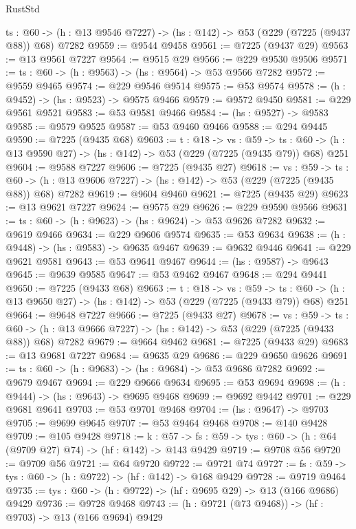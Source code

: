 \begin{lexlean}{RustStd}
\begin{coremodule}
  {ts : @60} -> (h : @13 @9546 @7227) -> (hs : @142) -> @53 (@229 (@7225 (@9437 @88)) @68) @7282
@9559 := @9544 @9458
@9561 := @7225 (@9437 @29)
@9563 := @13 @9561 @7227
@9564 := @9515 @29
@9566 := @229 @9530 @9506
@9571 := {ts : @60} -> (h : @9563) -> (hs : @9564) -> @53 @9566 @7282
@9572 := @9559 @9465
@9574 := @229 @9546 @9514
@9575 := @53 @9574
@9578 := (h : @9452) -> (hs : @9523) -> @9575 @9466
@9579 := @9572 @9450
@9581 := @229 @9561 @9521
@9583 := @53 @9581 @9466
@9584 := (hs : @9527) -> @9583
@9585 := @9579 @9525
@9587 := @53 @9460 @9466
@9588 := @294 @9445
@9590 := @7225 (@9435 @68)
@9603 := {t : @18} ->
  {vs : @59} ->
  {ts : @60} -> (h : @13 @9590 @27) -> (hs : @142) -> @53 (@229 (@7225 (@9435 @79)) @68) @251
@9604 := @9588 @7227
@9606 := @7225 (@9435 @27)
@9618 := {vs : @59} ->
  {ts : @60} -> (h : @13 @9606 @7227) -> (hs : @142) -> @53 (@229 (@7225 (@9435 @88)) @68) @7282
@9619 := @9604 @9460
@9621 := @7225 (@9435 @29)
@9623 := @13 @9621 @7227
@9624 := @9575 @29
@9626 := @229 @9590 @9566
@9631 := {ts : @60} -> (h : @9623) -> (hs : @9624) -> @53 @9626 @7282
@9632 := @9619 @9466
@9634 := @229 @9606 @9574
@9635 := @53 @9634
@9638 := (h : @9448) -> (hs : @9583) -> @9635 @9467
@9639 := @9632 @9446
@9641 := @229 @9621 @9581
@9643 := @53 @9641 @9467
@9644 := (hs : @9587) -> @9643
@9645 := @9639 @9585
@9647 := @53 @9462 @9467
@9648 := @294 @9441
@9650 := @7225 (@9433 @68)
@9663 := {t : @18} ->
  {vs : @59} ->
  {ts : @60} -> (h : @13 @9650 @27) -> (hs : @142) -> @53 (@229 (@7225 (@9433 @79)) @68) @251
@9664 := @9648 @7227
@9666 := @7225 (@9433 @27)
@9678 := {vs : @59} ->
  {ts : @60} -> (h : @13 @9666 @7227) -> (hs : @142) -> @53 (@229 (@7225 (@9433 @88)) @68) @7282
@9679 := @9664 @9462
@9681 := @7225 (@9433 @29)
@9683 := @13 @9681 @7227
@9684 := @9635 @29
@9686 := @229 @9650 @9626
@9691 := {ts : @60} -> (h : @9683) -> (hs : @9684) -> @53 @9686 @7282
@9692 := @9679 @9467
@9694 := @229 @9666 @9634
@9695 := @53 @9694
@9698 := (h : @9444) -> (hs : @9643) -> @9695 @9468
@9699 := @9692 @9442
@9701 := @229 @9681 @9641
@9703 := @53 @9701 @9468
@9704 := (hs : @9647) -> @9703
@9705 := @9699 @9645
@9707 := @53 @9464 @9468
@9708 := @140 @9428
@9709 := @105 @9428
@9718 := {k : @57} ->
  {fs : @59} -> {tys : @60} -> (h : @64 (@9709 @27) @74) -> (hf : @142) -> @143 @9429
@9719 := @9708 @56
@9720 := @9709 @56
@9721 := @64 @9720
@9722 := @9721 @74
@9727 := {fs : @59} -> {tys : @60} -> (h : @9722) -> (hf : @142) -> @168 @9429
@9728 := @9719 @9464
@9735 := {tys : @60} -> (h : @9722) -> (hf : @9695 @29) -> @13 (@166 @9686) @9429
@9736 := @9728 @9468
@9743 := (h : @9721 (@73 @9468)) -> (hf : @9703) -> @13 (@166 @9694) @9429

\end{coremodule}
\end{lexlean}
